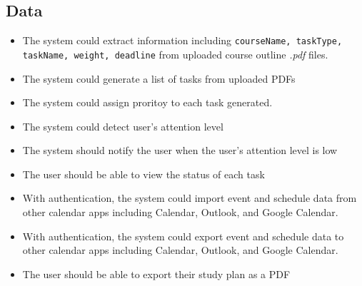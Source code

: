 \documentclass[12pt]{article}
\newcounter{reqnum} %
\newcommand{\rthereqnum}{FR\refstepcounter{reqnum}\thereqnum:}
\begin{document}
\subsection{Data}
\begin{itemize}
\item[\rthereqnum \label{R_GetConsent}]
The system could extract information including \texttt{courseName, taskType, taskName, weight, deadline} from uploaded course outline \textit{.pdf} files.
\item[\rthereqnum \label{R_GetConsent}]
The system could generate a list of tasks from uploaded PDFs 
\item[\rthereqnum \label{R_GetConsent}]
The system could assign proritoy to each task generated.
\item[\rthereqnum \label{R_GetConsent}]
The system could detect user's attention level
\item[\rthereqnum \label{R_GetConsent}]
The system should notify the user when the user's attention level is low
\item[\rthereqnum \label{R_GetConsent}]
The user should be able to view the status of each task
\item[\rthereqnum \label{R_GetConsent}]
With authentication, the system could import event and schedule data from other calendar apps including Calendar, Outlook, and Google Calendar.
\item[\rthereqnum \label{R_GetConsent}]
With authentication, the system could export event and schedule data to other calendar apps including Calendar, Outlook, and Google Calendar.
\item[\rthereqnum \label{R_GetConsent}]
The user should be able to export their study plan as a PDF
\end{itemize}
\end{document}
